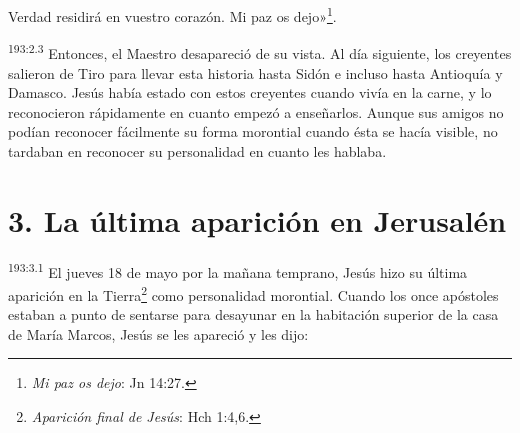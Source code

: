Verdad residirá en vuestro corazón. Mi paz os dejo»\footnote{\textit{Mi paz os dejo}: Jn 14:27.}.

\par
\textsuperscript{193:2.3} Entonces, el Maestro desapareció de su vista. Al día siguiente, los creyentes salieron de Tiro para llevar esta historia hasta Sidón e incluso hasta Antioquía y Damasco. Jesús había estado con estos creyentes cuando vivía en la carne, y lo reconocieron rápidamente en cuanto empezó a enseñarlos. Aunque sus amigos no podían reconocer fácilmente su forma morontial cuando ésta se hacía visible, no tardaban en reconocer su personalidad en cuanto les hablaba.

\section*{3. La última aparición en Jerusalén}
\par
\textsuperscript{193:3.1} El jueves 18 de mayo por la mañana temprano, Jesús hizo su última aparición en la Tierra\footnote{\textit{Aparición final de Jesús}: Hch 1:4,6.} como personalidad morontial. Cuando los once apóstoles estaban a punto de sentarse para desayunar en la habitación superior de la casa de María Marcos, Jesús se les apareció y les dijo:


